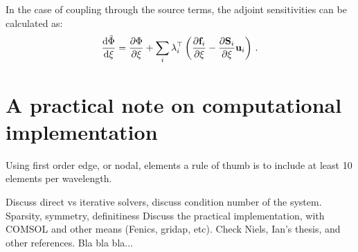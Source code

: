 In the case of coupling through the source terms, the adjoint sensitivities can be calculated as:
\begin{equation}
    \frac{\mathop{}\!\text{d} \tilde{\Phi}}{\mathop{}\!\text{d} \xi} = \frac{\partial \Phi}{\partial \xi} + \sum_i \lambda_{i}^{\top} \left( \frac{\partial \mathbf{f}_i}{\partial \xi} - \frac{\partial \mathbf{S}_i}{\partial \xi} \mathbf{u}_i  \right)\,.
\end{equation}

\section{A practical note on computational implementation}

Using first order edge, or nodal, elements a rule of thumb is to include at least 10 elements per wavelength.

Discuss direct vs iterative solvers, discuss condition number of the system.
Sparsity, symmetry, definitiness
Discuss the practical implementation, with COMSOL and other means (Fenics, gridap, etc).
Check Niels, Ian's thesis, and other references.
Bla bla bla...